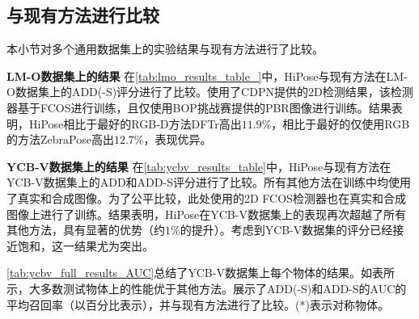 \subsection{与现有方法进行比较}
本小节对多个通用数据集上的实验结果与现有方法进行了比较。



\textbf{LM-O数据集上的结果 } 在\autoref{tab:lmo_results_table_}中，HiPose与现有方法在LM-O数据集上的ADD(-S)评分进行了比较。使用了CDPN\cite{li2019cdpn}提供的2D检测结果，该检测器基于FCOS\cite{Tian2019FCOSFC}进行训练，且仅使用BOP挑战赛提供的PBR图像进行训练。结果表明，HiPose相比于最好的RGB-D方法DFTr高出$11.9\%$，相比于最好的仅使用RGB的方法ZebraPose高出$12.7\%$，表现优异。



\textbf{YCB-V数据集上的结果 } 在\autoref{tab:ycbv_results_table}中，HiPose与现有方法在YCB-V数据集上的ADD和ADD-S评分进行了比较。所有其他方法在训练中均使用了真实和合成图像。为了公平比较，此处使用的2D FCOS检测器也在真实和合成图像上进行了训练。结果表明，HiPose在YCB-V数据集上的表现再次超越了所有其他方法，具有显著的优势（约$1\%$的提升）。考虑到YCB-V数据集的评分已经接近饱和，这一结果尤为突出。

\autoref{tab:ycbv_full_results_AUC}总结了YCB-V数据集上每个物体的结果。如表所示，大多数测试物体上的性能优于其他方法。展示了ADD(-S)和ADD-S的AUC的平均召回率（以百分比表示），并与现有方法进行了比较。(*)表示对称物体。



